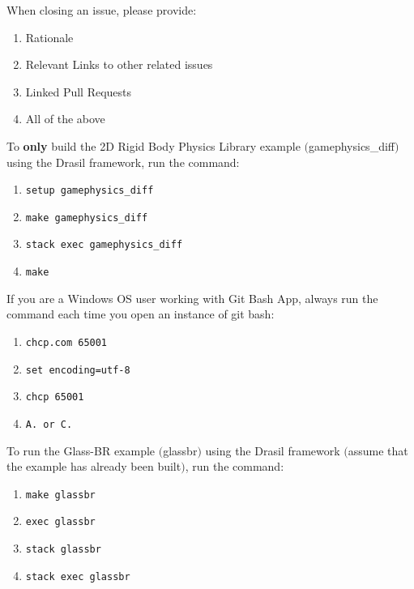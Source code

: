 \documentclass[12pt,fleqn]{examtst}
\begin{document}

\newpage
\noindent
\begin{minipage}{\textwidth}

When closing an issue, please provide:

\begin{enumerate}
    \item Rationale
    \item Relevant Links to other related issues
    \item Linked Pull Requests
    \item All of the above \marker
\end{enumerate}

To \textbf{only} build the 2D Rigid Body Physics Library example $($gamephysics\_diff$)$ using the Drasil framework, run the command:

\begin{enumerate}
    \item \lstinline{setup gamephysics_diff}
    \item \lstinline{make gamephysics_diff} \marker
    \item \lstinline{stack exec gamephysics_diff}
    \item \lstinline{make}
\end{enumerate}

If you are a Windows OS user working with Git Bash App, always run the command each time you open an instance of git bash:

\begin{enumerate}
    \item \lstinline{chcp.com 65001} 
    \item \lstinline{set encoding=utf-8}
    \item \lstinline{chcp 65001}
    \item \lstinline{A. or C.} \marker
\end{enumerate}

To run the Glass-BR example $($glassbr$)$ using the Drasil framework $($assume that the example has already been built$)$, run the command:

\begin{enumerate}
    \item \lstinline{make glassbr}
    \item \lstinline{exec glassbr}
    \item \lstinline{stack glassbr}
    \item \lstinline{stack exec glassbr} \marker
\end{enumerate}

\end{minipage}
\end{document}
